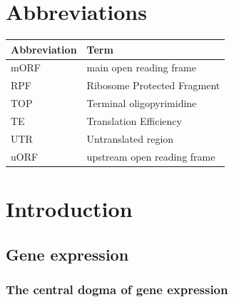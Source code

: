 \documentclass[12pt,openany]{book}
\author{}
\date{\vspace{-2.5em}}
\begin{document}
{
\setcounter{tocdepth}{4}
\tableofcontents
}
\cleardoublepage
\pagestyle{fancy} \fancyhf{} \renewcommand{\headrulewidth}{0pt}
\fancyfoot[LE,RO]{\thepage} \renewcommand{\floatpagefraction}{.9}
\setcounter{page}{9}

\chapter*{Abbreviations}\label{abbreviations}

\begin{tabular}{ll}
\toprule
Abbreviation & Term\\
\midrule
mORF & main open reading frame\\
RPF & Ribosome Protected Fragment\\
TOP & Terminal oligopyrimidine\\
TE & Translation Efficiency\\
UTR & Untranslated region\\
uORF & upstream open reading frame\\
\bottomrule
\end{tabular}

\chapter{Introduction}

\section{Gene expression}\subsection{The central dogma of gene expression}
\end{document}
